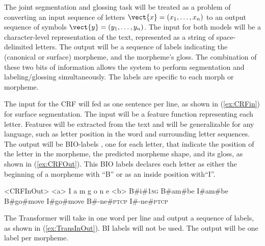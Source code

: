 The joint segmentation and glossing task will be treated as a problem of converting an input sequence of letters $\vect{x} = (x_1, \ldots, x_n)$ to an output sequence of symbols $\vect{y} = (y_1, \ldots, y_n)$. The input for both models will be a character-level representation of the text, represented as a string of space-delimited letters. The output will be a sequence of labels indicating the (canonical or surface) morpheme, and the morpheme's gloss. The combination of these two bits of information allows the system to perform segmentation and labeling/glossing simultaneously. The labels are specific to each morph or morpheme. %

The input for the CRF will fed as one sentence per line, as shown in (\ref{ex:CRFin}) for surface segmentation. The input will be a feature function representing each letter. Features will be extracted from the text and will be generalizable for any language, such as letter position in the word and surrounding letter sequences. The output will be BIO-labels \citep{ramshaw1999}, one for each letter, that indicate the position of the letter in the morpheme, the predicted morpheme shape, and its gloss, as shown in (\ref{ex:CRFOut}). This BIO labels declares each letter as either the beginning of a morpheme with ``B'' or as an inside position with``I''. 

\begin{singlespace}
\pex<CRFInOut>   
\label{ex:CRFInOut}
\a<a> \hspace{7 mm} I \hspace{13 mm} a \hspace{14 mm} m \hspace{15 mm} g \hspace{18 mm} o \hspace{20 mm} n \hspace{19 mm} e 
\label{ex:CRFin}
\a<b> B\#i\#1\textsc{sg} \hspace{.25 mm} B\#am\#be \hspace{.25 mm} I\#am\#be \hspace{.25 mm} B\#go\#move \hspace{.25 mm} I\#go\#move \hspace{.25 mm} B\#-ne\#\textsc{ptcp} \hspace{.25 mm} I\#-ne\#\textsc{ptcp}
\label{ex:CRFOut}
\xe
\end{singlespace}

The Transformer will take in one word per line and output a sequence of labels, as shown in (\ref{ex:TransInOut}). BI labels will not be used. The output will be one label per morpheme. 

